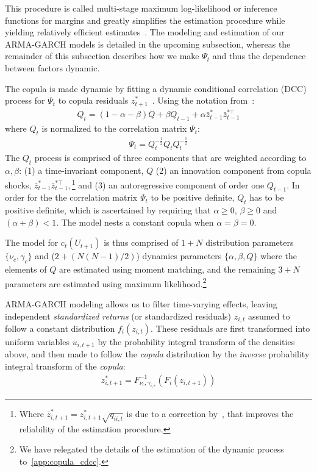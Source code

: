 This procedure is called multi-stage maximum log-likelihood or inference functions for margins and greatly simplifies the estimation procedure while yielding relatively efficient estimates~\autocite{Patton2006,Joe1997}. The modeling and estimation of our ARMA-GARCH models is detailed in the upcoming subsection, whereas the remainder of this subsection describes how we make $\Psi_t$ and thus the dependence between factors dynamic.

The copula is made dynamic by fitting a dynamic conditional correlation (DCC) process for $\Psi_t$ to copula residuals $z_{t+1}^*$~\autocite{Engle2002}. Using the notation from~\textcite{ChristoffersenLanglois2013}:
\begin{align}
  Q_t = (1 - \alpha - \beta) Q
    + \beta Q_{t-1}
    + \alpha \bar{z}_{t-1}^* \bar{z}_{t-1}^{*\top}
\end{align}
where $Q_t$ is normalized to the correlation matrix $\Psi_t$:
\begin{align}
  \Psi_t = Q_t^{-\frac{1}{2}} Q_t Q_t^{-\frac{1}{2}}
\end{align}
The $Q_t$ process is comprised of three components that are weighted according to $\alpha, \beta$: (1) a time-invariant component, $Q$ (2) an innovation component from copula shocks, $\bar{z}_{t-1}^{*} \bar{z}_{t-1}^{*\top},$\footnote{Where $\bar{z}_{i,t+1}^* = z_{i,t+1}^* \sqrt{q_{ii,t}}$ is due to a correction by~\textcite{Aielli2013}, that improves the reliability of the estimation procedure.} and (3) an autoregressive component of order one $Q_{t-1}$. In order for the the correlation matrix $\Psi_t$ to be positive definite, $Q_t$ has to be positive definite, which is ascertained by requiring that $\alpha \geq 0$, $\beta \geq 0$ and $(\alpha + \beta) < 1$. The model nests a constant copula when $\alpha = \beta = 0$.

The model for $c_t(U_{t+1})$ is thus comprised of $1 + N$ distribution parameters $\{\nu_c, \gamma_c\}$ and ($2 + (N(N-1) / 2)$) dynamics parameters $\{\alpha, \beta, Q\}$ where the elements of $Q$ are estimated using moment matching, and the remaining $3 + N$ parameters are estimated using maximum likelihood.\footnote{We have relegated the details of the estimation of the dynamic process to~\autoref{app:copula_cdcc}.}

ARMA-GARCH modeling allows us to filter time-varying effects, leaving independent \emph{standardized returns} (or standardized residuals) $z_{i,t}$ assumed to follow a constant distribution $f_i(z_{i,t})$. These residuals are first transformed into uniform variables $u_{i,t+1}$ by the probability integral transform of the densities above, and then made to follow the \emph{copula} distribution by the \emph{inverse} probability integral transform of the \emph{copula}:
\begin{align}
  z_{i,t+1}^* = F^{-1}_{\nu_c,\gamma_{i,c}}(F_{i}(z_{i,t+1}))
\end{align}



